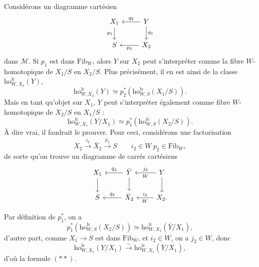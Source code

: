 \documentclass[11pt]{article}
\newcommand{\printedpage}[1]{\marginpar{\footnotesize p.~#1}}
\newcommand{\msp}[1]{\marginpar{\footnotesize [#1]}}
\newcommand{\ho}{\mathrm{ho}}
\newcommand{\lc}{\mathrm{lc}}
\begin{document}
Considérons un diagramme cartésien
\[
\begin{tikzcd}[ampersand replacement=\&]
X_1 \arrow[d, "p_1"'] \& Y \arrow[l, "q_2"'] \arrow[d, "q_1"] \\
S \& X_2 \arrow[l, "p_2"]
\end{tikzcd}
\]
\printedpage{156}
dans $\mathcal{M}$. Si $p_1$ est dans $\mathrm{Fib}_W$, alors $Y$ sur $X_2$ peut s'interpréter comme la fibre $W$-homotopique de $X_1/S$ en $X_2/S$. Plus précisément, il en est ainsi de la classe $\ho^{\lc}_{W,X_2}(Y)$,
\[
\ho^{\lc}_{W,X_2}(Y) \simeq p_2^*(\ho^{\lc}_{W,S}(X_1/S)). \tag*{$(*)$}
\]
Mais en tant qu'objet sur $X_1$, $Y$ peut s'interpréter également comme fibre $W$-homotopique de $X_2/S$ en $X_1/S$ :
\[
\ho^{\lc}_{W,X_1}(Y/X_1) \simeq p_1^*(\ho^{\lc}_{W,S}(X_2/S)). \tag*{$(**)$}
\]
À dire vrai, il faudrait le prouver. Pour ceci, considérons une factorisation
\[
X_2 \xrightarrow{i_2} \bar{X}_2 \xrightarrow{\bar{p}_2} S \qquad i_2 \in W\ p_2 \in \mathrm{Fib}_W, %
\]
de sorte qu'on trouve un diagramme de carrés cartésiens
\[
\begin{tikzcd}[ampersand replacement=\&]
X_1 \arrow[d] \& \bar{Y} \arrow[l, "\bar{q}_2"'] \arrow[d] \& Y \arrow[l, "j_2"', "W"] \arrow[d] \\
S \& \bar{X}_2 \arrow[l, "\bar{q}_2"'] \& X_2. \arrow[l, "i_2"', "W"] %
\end{tikzcd}
\]

\msp{page 242}
Par définition de $p_1^*$, on a
\[
p_1^*(\ho^{\lc}_{W,S}(X_2/S)) \simeq \ho^{\lc}_{W,X_1}(\bar{Y}/X_1),
\]
d'autre part, comme $X_1 \longrightarrow S$ est dans $\mathrm{Fib}_W$, et $i_2 \in W$, on a $j_2 \in W$, donc
\[
\ho^{\lc}_{W,X_1}(Y/X_1) \xrightarrow{\sim} \ho^{\lc}_{W,X_1}(\bar{Y}/X_1),
\]
d'où la formule $(**)$.
\end{document}

